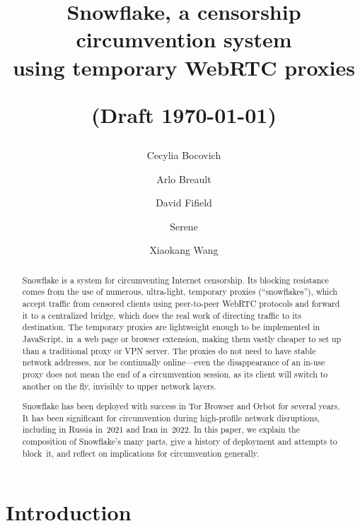 \documentclass[letterpaper,twocolumn]{article}
\begin{document}
\date{}

\title{Snowflake, a censorship circumvention system\\using temporary WebRTC proxies\\\strut\large (Draft \today)}

\author{%
Cecylia Bocovich%
\and
Arlo Breault%
\and
David Fifield%
\and
Serene%
\and
Xiaokang Wang%
}
\renewcommand{\maketitlehookc}{\centering\normalsize Authors are listed alphabetically.}

\maketitle

\begin{abstract}
Snowflake is a system for circumventing Internet censorship.
Its blocking resistance comes from
the use of numerous, ultra-light, temporary proxies (``snowflakes''),
which accept traffic from censored clients using peer-to-peer WebRTC protocols
and forward it to a centralized bridge,
which does the real work of directing traffic to its destination.
The temporary proxies are lightweight enough to be implemented in JavaScript,
in~a web page or browser extension,
making them vastly cheaper to set up than
a traditional proxy or VPN server.
The proxies do not need to have stable network addresses,
nor be continually online---even
the disappearance of an \mbox{in-use} proxy
does not mean the end of a circumvention session,
as its client will switch to another on the fly,
invisibly to upper network layers.


Snowflake has been deployed with success
in Tor Browser and Orbot for several years.
It has been significant for circumvention
during high-profile network disruptions,
including in Russia in~2021 and Iran in~2022.
In this paper, we explain the composition of Snowflake's many parts,
give a history of deployment and attempts to block~it,
and reflect on implications for circumvention generally.
\end{abstract}


\section{Introduction}
\label{sec:intro}
\end{document}
